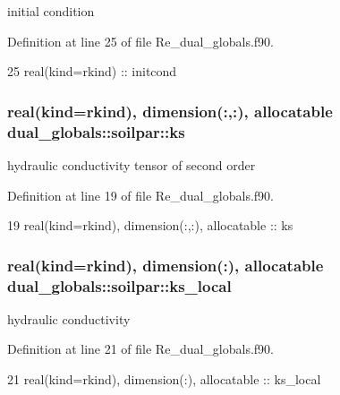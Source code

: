 initial condition 



Definition at line 25 of file Re\+\_\+dual\+\_\+globals.\+f90.


\begin{DoxyCode}
25     \textcolor{keywordtype}{real(kind=rkind)} :: initcond
\end{DoxyCode}
\subsubsection[{ks}]{\setlength{\rightskip}{0pt plus 5cm}real(kind=rkind), dimension(\+:,\+:), allocatable dual\+\_\+globals\+::soilpar\+::ks}\label{structdual__globals_1_1soilpar_a617f8a47209b6ad01a191cbfdc5affa9}


hydraulic conductivity tensor of second order 



Definition at line 19 of file Re\+\_\+dual\+\_\+globals.\+f90.


\begin{DoxyCode}
19     \textcolor{keywordtype}{real(kind=rkind)}, \textcolor{keywordtype}{dimension(:,:)}, \textcolor{keywordtype}{allocatable} :: ks
\end{DoxyCode}
\subsubsection[{ks\+\_\+local}]{\setlength{\rightskip}{0pt plus 5cm}real(kind=rkind), dimension(\+:), allocatable dual\+\_\+globals\+::soilpar\+::ks\+\_\+local}\label{structdual__globals_1_1soilpar_a9e1928e1f191bf5d8479130e30889b81}


hydraulic conductivity 



Definition at line 21 of file Re\+\_\+dual\+\_\+globals.\+f90.


\begin{DoxyCode}
21     \textcolor{keywordtype}{real(kind=rkind)}, \textcolor{keywordtype}{dimension(:)}, \textcolor{keywordtype}{allocatable}   :: ks\_local
\end{DoxyCode}
